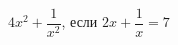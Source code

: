 \begin{ex}[type=calculate_expression]
	\begin{condition}
		\( 4x^2+\dfrac{1}{x^2} \), \quad если \( 2x+\dfrac{1}{x}=7 \)
	\end{condition}
\end{ex}